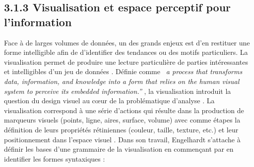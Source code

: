 \subsection[Visualisation et espace perceptif pour l{\textquoteright}information]{3.1.3 Visualisation et espace perceptif pour l{\textquoteright}information}
Face \`a de larges volumes de donn\'ees, un des grands enjeux est
d{\textquoteright}en restituer une forme intelligible afin de
d{\textquoteright}identifier des tendances ou des motifs particuliers.
La visualisation permet de produire une lecture particuli\`ere de
parties int\'eressantes et intelligibles d{\textquoteright}un jeu de
donn\'ees \citep{Cairo2013}. D\'efinie comme \textit{{\guillemotleft}~a
process that transforms data, information, and knowledge into a form
that relies on the human visual system to perceive its embedded
information.{\textquotedblright}} \citep{Graffieti2010}, la
visualisation introduit la question du design visuel au c{\oe}ur de la
probl\'ematique d{\textquoteright}analyse \citep{Wesolowsky1992}.
La visualisation correspond \`a une s\'erie d{\textquoteright}actions
qui r\'esulte dans la production de marqueurs visuels (points, ligne,
aires, surface, volume) avec comme \'etapes la d\'efinition de leurs
propri\'et\'es r\'etiniennes (couleur, taille, texture, etc.) et leur
positionnement dans l{\textquoteright}espace visuel \citep{Card1997}. Dans son travail, Engelhardt \cite{Engelhardt2007} s’attache 
 \`a d\'efinir les bases d{\textquoteright}une grammaire de la
visualisation en commen\c{c}ant par en identifier les formes
syntaxiques : 

